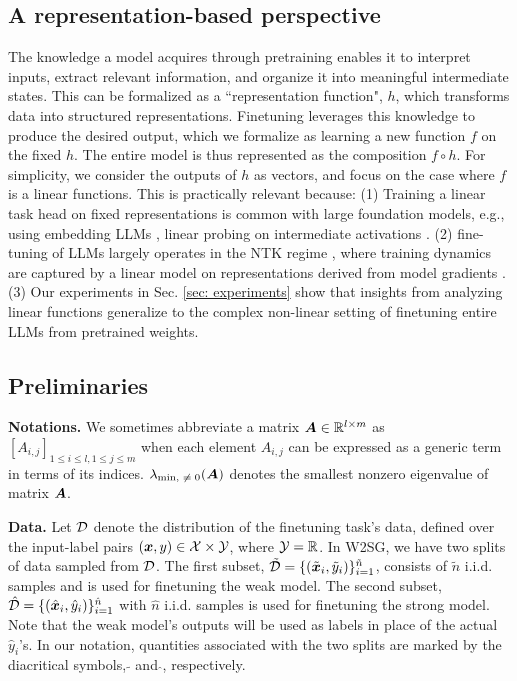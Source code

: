 \subsection{A representation-based perspective}

The knowledge a model acquires through pretraining enables it to interpret inputs, extract relevant information, and organize it into meaningful intermediate states. This can be formalized as a ``representation function", $h$, which transforms data into structured representations. Finetuning leverages this knowledge to produce the desired output, which we formalize as learning a new function $f$ on the fixed $h$. The entire model is thus represented as the composition $f\!\circ\! h$. For simplicity, we consider the outputs of $h$ as vectors, and focus on the case where $f$ is a linear functions. This is practically relevant because: (1) Training a linear task head on fixed representations is common with large foundation models, e.g., using embedding LLMs \cite{muennighoff2022mteb}, linear probing on intermediate activations \cite{zou2023representation,nanda2023emergent,marks2023geometry}. (2) fine-tuning of LLMs largely operates in the NTK regime \cite{jacot2018neural}, where training dynamics are captured by a linear model on representations derived from model gradients \cite{malladi2023kernel}. (3) Our experiments in Sec. \ref{sec: experiments} show that insights from analyzing linear functions generalize to the complex non-linear setting of finetuning entire LLMs from pretrained weights. 


\subsection{{Preliminaries}}\label{subsec: pre}

{\textbf{Notations.} We sometimes abbreviate a matrix ${\bm{A}} \in {\mathbb{R}}^{l \times m}$ as $[A_{i,j}]_{1 \leq i \leq l, 1 \leq j \leq m}$ when each element $A_{i,j}$ can be expressed as a generic term in terms of its indices. $\lambda_{\text{min, $\neq 0$}}({\bm{A}})$ denotes the smallest nonzero eigenvalue of matrix ${\bm{A}}$.} 

\textbf{Data.} Let ${\mathcal{D}}$ denote the distribution of the finetuning task's data, defined over the input-label pairs $({\bm{x}}, y)\in{\mathcal{X}}\times{\mathcal{Y}}$, where ${\mathcal{Y}}={\mathbb{R}}$. In W2SG, we have two splits of data sampled from ${\mathcal{D}}$. The first subset, $\tilde{{\mathcal{D}}}=\{(\tilde{{\bm{x}}}_i, \tilde{y}_i)\}_{i=1}^{\tilde{n}}$, consists of $\tilde{n}$ i.i.d. samples and is used for finetuning the weak model. The second subset, $\hat{{\mathcal{D}}}=\{(\hat{{\bm{x}}}_i, \hat{y}_i)\}_{i=1}^{\hat{n}}$ with $\hat{n}$ i.i.d. samples is used for finetuning the strong model. Note that the weak model's outputs will be used as labels in place of the actual $\hat{y}_i$'s. In our notation, quantities associated with the two splits are marked by the diacritical symbols, $\tilde{}$ and $\hat{}$, respectively.



